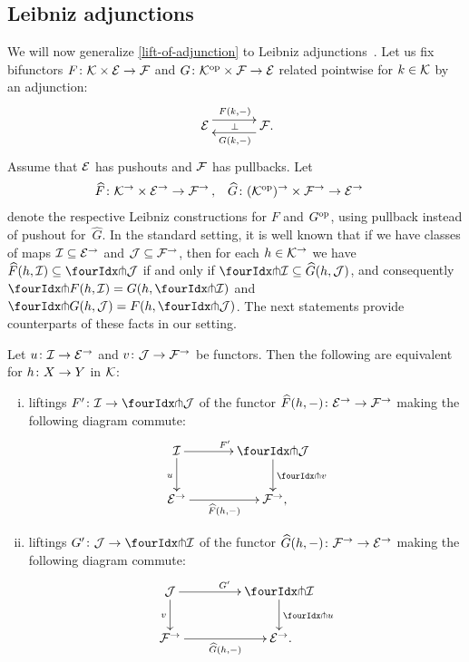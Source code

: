 \documentclass[reqno,10pt,a4paper,oneside,draft]{amsart}
\begin{document}

\subsection*{Leibniz adjunctions}

We will now generalize \cref{lift-of-adjunction} to Leibniz adjunctions~\cite{riehl-verity:reedy}.
Let us fix bifunctors $F \co \cal{K} \times \catE \to \cal{F}$ and $G \co \cal{K}^{\op} \times \cal{F} \to \catE$ related pointwise for $k \in \cal{K}$ by an adjunction:
\[
\xymatrix@C+1em{
  \catE
  \ar@<5pt>[r]^{F(k, \arghole)}
  \ar@{}[r]|{\bot}
&
  \cal{F}
  \ar@<5pt>[l]^{G(k, \arghole)}
\rlap{.}}
\]
Assume that $\catE$ has pushouts and $\cal{F}$ has pullbacks.
Let
\[
\begin{aligned}
  \widehat{F} &\co \cal{K}^\to \times \catE^\to \to \cal{F}^\to
\, ,&
  \widehat{G} &\co (\cal{K}^{\op})^\to \times \cal{F}^\to \to \catE^\to
\end{aligned}
\]
denote the respective Leibniz constructions for $F$ and $G^{\op}$, using pullback instead of pushout for~$\widehat{G}$.
In the standard setting, it is well known that if we have classes of maps $\cal{I} \subseteq \catE^\to$ and $\cal{J} \subseteq \cal{F}^\to$, then for each $h \in \cal{K}^\to$ we have $\widehat{F}(h, \cal{I}) \subseteq \liftl{\cal{J}}$ if and only if $\liftr{\cal{I}} \subseteq \widehat{G}(h, \cal{J})$, and consequently $\liftr{F(h, \cal{I})} = G(h, \liftr{\cal{I}})$ and $\liftl{G(h, \cal{J})} = F(h, \liftl{\cal{J}})$.
The next statements provide counterparts of these facts in our setting.

\begin{proposition} \label{lift-of-leibniz-adjunction}
Let $u \co \cal{I} \to \catE^\to$ and $v \co \cal{J} \to \cal{F}^\to$ be functors.
Then the following are equivalent for $h \co X \to Y$ in $\cal{K}$:
\begin{enumerate}[(i)]
\item liftings $F' \co \cal{I} \to \liftl{\cal{J}}$ of the functor $\widehat{F}(h, \arghole) \co \catE^\to \to \cal{F}^\to$ making the following diagram commute:
\[
\xymatrix@C=1.2cm{
  \cal{I}
  \ar[r]^{F'}
  \ar[d]_{u}
&
  \liftl{\cal{J}}
  \ar[d]^{\liftl{v}}
\\
  \catE^\to
  \ar[r]_-{\widehat{F}(h, \arghole)}
&
  \cal{F}^\to
\rlap{,}}
\]
\item liftings $G' \co \cal{J} \to \liftr{\cal{I}}$ of the functor $\widehat{G}(h, \arghole) \co \cal{F}^\to \to \catE^\to$ making the following diagram commute:
\[
\xymatrix@C+2em{
  \cal{J}
  \ar[d]_{v}
  \ar[r]^{G'}
&
  \liftr{\cal{I}}
  \ar[d]^{\liftr{u}}
\\
  \cal{F}^\to
  \ar[r]_-{\widehat{G}(h, \arghole)}
&
  \catE^\to
\rlap{.}}
\]
\end{enumerate}
\end{proposition}
\end{document}
